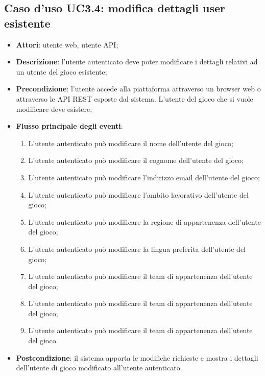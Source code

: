 \subsection{Caso d'uso UC3.4: modifica dettagli user esistente}
\begin{itemize}
\item \textbf{Attori}: utente web, utente API;
\item \textbf{Descrizione}: l'utente autenticato deve poter modificare i dettagli relativi ad un utente del gioco esistente; 
      \item \textbf{Precondizione}: l'utente accede alla piattaforma attraverso un browser web o attraverso le API REST esposte dal sistema. L'utente del gioco che si vuole modificare deve esistere;

        \item \textbf{Flusso principale degli eventi}:
          \begin{enumerate}
          \item L'utente autenticato può modificare il nome dell'utente del gioco;
          \item L'utente autenticato può modificare il cognome dell'utente del gioco;
          \item L'utente autenticato può modificare l'indirizzo email dell'utente del gioco;
          \item L'utente autenticato può modificare l'ambito lavorativo dell'utente del gioco;
          \item L'utente autenticato può modificare la regione di appartenenza dell'utente del gioco;
          \item L'utente autenticato può modificare la lingua preferita dell'utente del gioco;
          \item L'utente autenticato può modificare il team di appartenenza dell'utente del gioco;
          \item L'utente autenticato può modificare il team di appartenenza dell'utente del gioco;
          \item L'utente autenticato può modificare il team di appartenenza dell'utente del gioco.

      \end{enumerate}
    \item \textbf{Postcondizione}: il sistema apporta le modifiche richieste e mostra i dettagli dell'utente di gioco modificato all'utente autenticato.
  \end{itemize}
\hypertarget{UC3.5}{}
